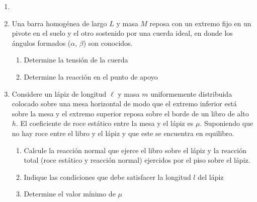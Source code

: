 \documentclass[letterpaper,11pt]{article}
\begin{document}
\vspace{-1cm}
\begin{enumerate}\setlength{\itemsep}{0.4cm}


\item[]

\item Una barra homogénea de largo $L$ y masa $M$ reposa con un extremo fijo en un pivote en el suelo y el otro sostenido por una cuerda ideal, en donde los ángulos formados ($\alpha$, $\beta$) son conocidos.
    \begin{enumerate}
        \item Determine la tensión de la cuerda
        
        \item Determine la reacción en el punto de apoyo
    \end{enumerate}

    \begin{figure}[H]
      \centering
      
    \end{figure}
    
\item Considere un lápiz de longitud $\ell$ y masa $m$ uniformemente distribuida colocado sobre una mesa horizontal de modo que el extremo inferior está sobre la mesa y el extremo superior reposa sobre el borde de un libro de alto $h$. El coeficiente de roce estático entre la mesa y el lápiz es $\mu$. Suponiendo que no hay roce entre el libro y el lápiz y que este se encuentra en equilibro.
    \begin{enumerate}
        \item Calcule la reacción normal que ejerce el libro sobre el lápiz y la reacción total (roce estático y reacción normal) ejercidos por el piso sobre el lápiz.
        
        \item Indique las condiciones que debe satisfacer la longitud $l$ del lápiz
        
        \item Determine el valor mínimo de $\mu$
    \end{enumerate}
    
    \begin{figure}[H]
      \centering
      
    \end{figure}


\end{enumerate}
\end{document}
